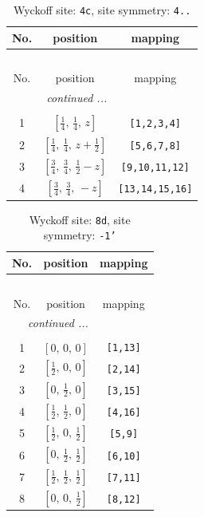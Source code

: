 \documentclass[fleqn,8pt]{jsarticle}
\begin{document}
\renewcommand{\arraystretch}{1.2}
\begin{longtable}{ccc}
\caption{Wyckoff site: {\tt 4c}, site symmetry: {\tt 4..}}
 \\
 \hline \hline
No. & position & mapping \\ \hline \endfirsthead

\multicolumn{2}{l}{\tablename\ \thetable{}} \\
 \hline \hline
No. & position & mapping \\ \hline \endhead

 \hline \hline
\multicolumn{2}{r}{\footnotesize\it continued ...} \\ \endfoot

 \hline \hline
\multicolumn{2}{r}{} \\ \endlastfoot

1 & $\left[ \frac{1}{4},\, \frac{1}{4},\, z \right]$ & {\tt [1,2,3,4]} \\ \hline
2 & $\left[ \frac{1}{4},\, \frac{1}{4},\, z + \frac{1}{2} \right]$ & {\tt [5,6,7,8]} \\ \hline
3 & $\left[ \frac{3}{4},\, \frac{3}{4},\, \frac{1}{2} - z \right]$ & {\tt [9,10,11,12]} \\ \hline
4 & $\left[ \frac{3}{4},\, \frac{3}{4},\, - z \right]$ & {\tt [13,14,15,16]} \\
\end{longtable}
\renewcommand{\arraystretch}{1.2}
\begin{longtable}{ccc}
\caption{Wyckoff site: {\tt 8d}, site symmetry: {\tt -1'}}
 \\
 \hline \hline
No. & position & mapping \\ \hline \endfirsthead

\multicolumn{2}{l}{\tablename\ \thetable{}} \\
 \hline \hline
No. & position & mapping \\ \hline \endhead

 \hline \hline
\multicolumn{2}{r}{\footnotesize\it continued ...} \\ \endfoot

 \hline \hline
\multicolumn{2}{r}{} \\ \endlastfoot

1 & $\left[ 0,\, 0,\, 0 \right]$ & {\tt [1,13]} \\ \hline
2 & $\left[ \frac{1}{2},\, 0,\, 0 \right]$ & {\tt [2,14]} \\ \hline
3 & $\left[ 0,\, \frac{1}{2},\, 0 \right]$ & {\tt [3,15]} \\ \hline
4 & $\left[ \frac{1}{2},\, \frac{1}{2},\, 0 \right]$ & {\tt [4,16]} \\ \hline
5 & $\left[ \frac{1}{2},\, 0,\, \frac{1}{2} \right]$ & {\tt [5,9]} \\ \hline
6 & $\left[ 0,\, \frac{1}{2},\, \frac{1}{2} \right]$ & {\tt [6,10]} \\ \hline
7 & $\left[ \frac{1}{2},\, \frac{1}{2},\, \frac{1}{2} \right]$ & {\tt [7,11]} \\ \hline
8 & $\left[ 0,\, 0,\, \frac{1}{2} \right]$ & {\tt [8,12]} \\
\end{longtable}
\end{document}
